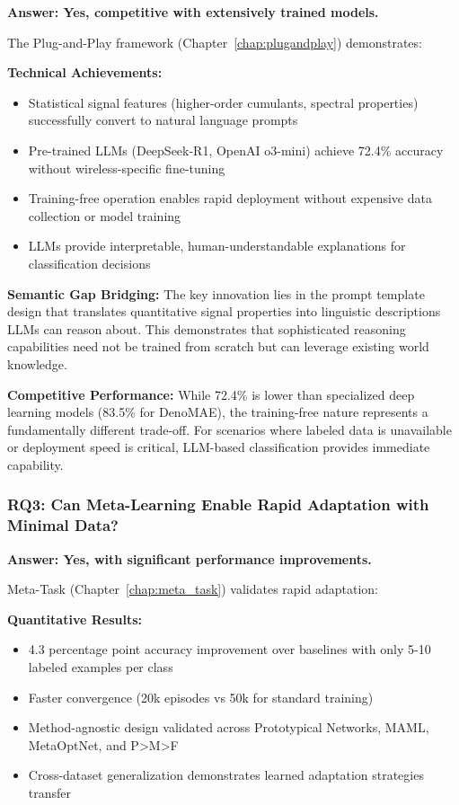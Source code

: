 \textbf{Answer: Yes, competitive with extensively trained models.}

The Plug-and-Play framework (Chapter~\ref{chap:plugandplay}) demonstrates:

\textbf{Technical Achievements:}
\begin{itemize}
    \item Statistical signal features (higher-order cumulants, spectral properties) successfully convert to natural language prompts
    \item Pre-trained LLMs (DeepSeek-R1, OpenAI o3-mini) achieve 72.4\% accuracy without wireless-specific fine-tuning
    \item Training-free operation enables rapid deployment without expensive data collection or model training
    \item LLMs provide interpretable, human-understandable explanations for classification decisions
\end{itemize}

\textbf{Semantic Gap Bridging:} The key innovation lies in the prompt template design that translates quantitative signal properties into linguistic descriptions LLMs can reason about. This demonstrates that sophisticated reasoning capabilities need not be trained from scratch but can leverage existing world knowledge.

\textbf{Competitive Performance:} While 72.4\% is lower than specialized deep learning models (83.5\% for DenoMAE), the training-free nature represents a fundamentally different trade-off. For scenarios where labeled data is unavailable or deployment speed is critical, LLM-based classification provides immediate capability.

\subsubsection{RQ3: Can Meta-Learning Enable Rapid Adaptation with Minimal Data?}

\textbf{Answer: Yes, with significant performance improvements.}

Meta-Task (Chapter~\ref{chap:meta_task}) validates rapid adaptation:

\textbf{Quantitative Results:}
\begin{itemize}
    \item 4.3 percentage point accuracy improvement over baselines with only 5-10 labeled examples per class
    \item Faster convergence (20k episodes vs 50k for standard training)
    \item Method-agnostic design validated across Prototypical Networks, MAML, MetaOptNet, and P>M>F
    \item Cross-dataset generalization demonstrates learned adaptation strategies transfer
\end{itemize}

